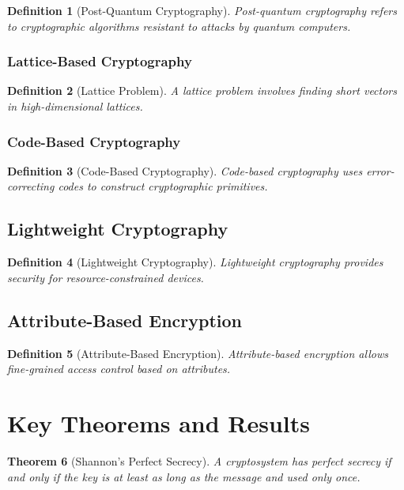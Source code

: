 \documentclass[11pt,a4paper]{article}
\newtheorem{theorem}{Theorem}[section]
\newtheorem{definition}[theorem]{Definition}
\begin{document}
\begin{definition}[Post-Quantum Cryptography]
Post-quantum cryptography refers to cryptographic algorithms resistant to attacks by quantum computers.
\end{definition}

\subsubsection{Lattice-Based Cryptography}

\begin{definition}[Lattice Problem]
A lattice problem involves finding short vectors in high-dimensional lattices.
\end{definition}

\subsubsection{Code-Based Cryptography}

\begin{definition}[Code-Based Cryptography]
Code-based cryptography uses error-correcting codes to construct cryptographic primitives.
\end{definition}

\subsection{Lightweight Cryptography}

\begin{definition}[Lightweight Cryptography]
Lightweight cryptography provides security for resource-constrained devices.
\end{definition}

\subsection{Attribute-Based Encryption}

\begin{definition}[Attribute-Based Encryption]
Attribute-based encryption allows fine-grained access control based on attributes.
\end{definition}

\section{Key Theorems and Results}

\begin{theorem}[Shannon's Perfect Secrecy]
A cryptosystem has perfect secrecy if and only if the key is at least as long as the message and used only once.
\end{theorem}
\end{document}
